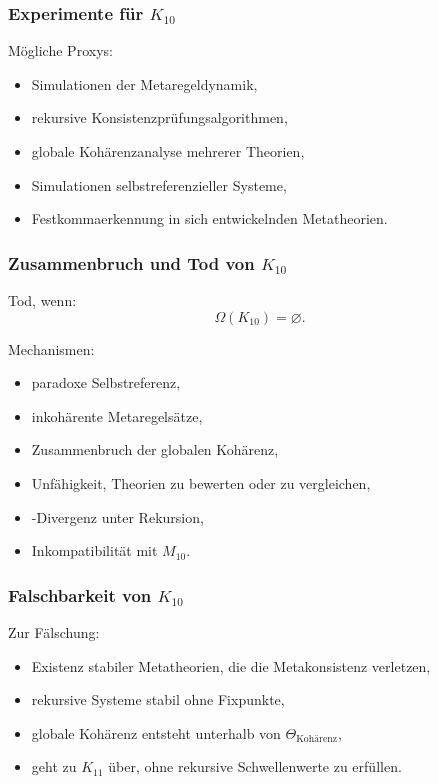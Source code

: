 \subsubsection{Experimente für $K_{10}$}

Mögliche Proxys:
\begin{itemize}
    \item Simulationen der Metaregeldynamik,
    \item rekursive Konsistenzprüfungsalgorithmen,
    \item globale Kohärenzanalyse mehrerer Theorien,
    \item Simulationen selbstreferenzieller Systeme,
    \item Festkommaerkennung in sich entwickelnden Metatheorien.
\end{itemize}

\subsubsection{Zusammenbruch und Tod von $K_{10}$}

Tod, wenn:
\[
\Omega(K_{10})=\varnothing.
\]

Mechanismen:
\begin{itemize}
    \item paradoxe Selbstreferenz,
    \item inkohärente Metaregelsätze,
    \item Zusammenbruch der globalen Kohärenz,
    \item Unfähigkeit, Theorien zu bewerten oder zu vergleichen,
    \item-Divergenz unter Rekursion,
    \item Inkompatibilität mit $M_{10}$.
\end{itemize}

\subsubsection{Falschbarkeit von $K_{10}$}

Zur Fälschung:
\begin{itemize}
    \item Existenz stabiler Metatheorien, die die Metakonsistenz verletzen,
    \item rekursive Systeme stabil ohne Fixpunkte,
    \item globale Kohärenz entsteht unterhalb von $\Theta_{\mathrm{Kohärenz}}$,
    \item geht zu $K_{11}$ über, ohne rekursive Schwellenwerte zu erfüllen.
\end{itemize}

